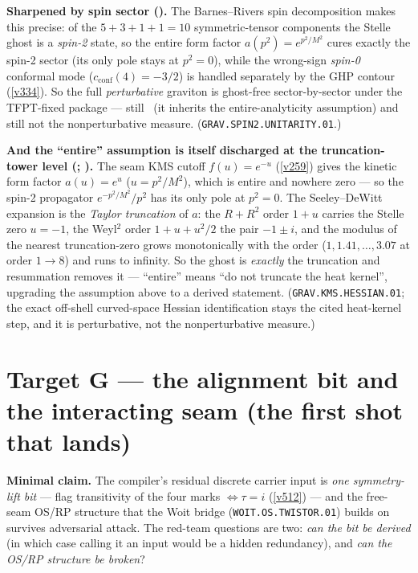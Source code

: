 \documentclass[11pt,a4paper]{article}
\begin{document}
\par\smallskip\noindent\textbf{Sharpened by spin sector (\mC).} The Barnes--Rivers spin decomposition makes
this precise: of the $5{+}3{+}1{+}1{=}10$ symmetric-tensor components the Stelle ghost is a \emph{spin-2} state,
so the entire form factor $a(p^2){=}e^{p^2/M^2}$ cures exactly the spin-2 sector (its only pole stays at
$p^2{=}0$), while the wrong-sign \emph{spin-0} conformal mode ($c_{\mathrm{conf}}(4){=}-3/2$) is handled
separately by the GHP contour (\vref{v334}). So the full \emph{perturbative} graviton is ghost-free
sector-by-sector under the TFPT-fixed package --- still \mC\ (it inherits the entire-analyticity assumption) and
still not the nonperturbative measure. (\texttt{GRAV.SPIN2.UNITARITY.01}.) 

\par\smallskip\noindent\textbf{And the ``entire'' assumption is itself discharged at the truncation-tower level
(\mE; ).} The seam KMS cutoff $f(u){=}e^{-u}$ (\vref{v259}) gives the kinetic
form factor $a(u){=}e^{u}$ ($u{=}p^2/M^2$), which is entire and nowhere zero --- so the spin-2 propagator
$e^{-p^2/M^2}/p^2$ has its only pole at $p^2{=}0$. The Seeley--DeWitt expansion is the \emph{Taylor truncation}
of $a$: the $R{+}R^2$ order $1{+}u$ carries the Stelle zero $u{=}-1$, the Weyl$^2$ order $1{+}u{+}u^2/2$ the
pair $-1{\pm}i$, and the modulus of the nearest truncation-zero grows monotonically with the order
($1,1.41,\dots,3.07$ at order $1\!\to\!8$) and runs to infinity. So the ghost is \emph{exactly} the truncation
and resummation removes it --- ``entire'' means ``do not truncate the heat kernel'', upgrading the assumption
above to a derived statement. (\texttt{GRAV.KMS.HESSIAN.01}; the exact off-shell curved-space Hessian
identification stays the cited heat-kernel step, and it is perturbative, not the nonperturbative measure.)

\section*{Target G --- the alignment bit and the interacting seam (the first shot that lands)}\label{sec:G}
\noindent\textbf{Minimal claim.} The compiler's residual discrete carrier input is \emph{one
symmetry-lift bit} --- flag transitivity of the four marks $\iff\tau=i$ (\vref{v512}) --- and the
free-seam OS/RP structure that the Woit bridge (\texttt{WOIT.OS.TWISTOR.01}) builds on survives
adversarial attack. The red-team questions are two: \emph{can the bit be derived} (in which case
calling it an input would be a hidden redundancy), and \emph{can the OS/RP structure be broken}?
\end{document}
